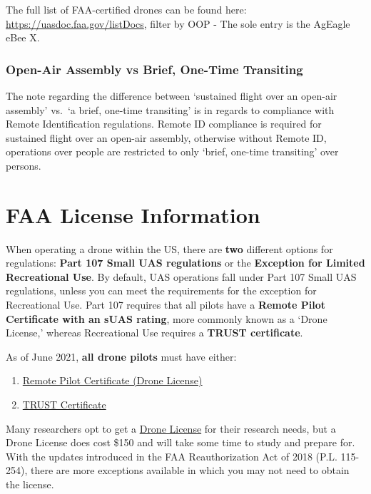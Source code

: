 \documentclass[
  12pt,
]{book}
\providecommand{\tightlist}{%
  \setlength{\itemsep}{0pt}\setlength{\parskip}{0pt}}
\begin{document}
The full list of FAA-certified drones can be found here: \url{https://uasdoc.faa.gov/listDocs}, filter by OOP - The sole entry is the AgEagle eBee X.

\subsection{Open-Air Assembly vs Brief, One-Time Transiting}\label{open-air-assembly-vs-brief-one-time-transiting}

The note regarding the difference between `sustained flight over an open-air assembly' vs.~`a brief, one-time transiting' is in regards to compliance with Remote Identification regulations. Remote ID compliance is required for sustained flight over an open-air assembly, otherwise without Remote ID, operations over people are restricted to only `brief, one-time transiting' over persons.

\chapter{FAA License Information}\label{license}

When operating a drone within the US, there are \textbf{two} different options for regulations: \textbf{Part 107 Small UAS regulations} or the \textbf{Exception for Limited Recreational Use}. By default, UAS operations fall under Part 107 Small UAS regulations, unless you can meet the requirements for the exception for Recreational Use. Part 107 requires that all pilots have a \textbf{Remote Pilot Certificate with an sUAS rating}, more commonly known as a `Drone License,' whereas Recreational Use requires a \textbf{TRUST certificate}.

As of June 2021, \textbf{all drone pilots} must have either:

\begin{enumerate}
\def\labelenumi{\arabic{enumi}.}
\tightlist
\item
  \hyperref[get-license]{Remote Pilot Certificate (Drone License)}
\item
  \hyperref[TRUST]{TRUST Certificate}
\end{enumerate}

Many researchers opt to get a \hyperref[get-license]{Drone License} for their research needs, but a Drone License does cost \$150 and will take some time to study and prepare for. With the updates introduced in the FAA Reauthorization Act of 2018 (P.L. 115-254), there are more exceptions available in which you may not need to obtain the license.
\end{document}
